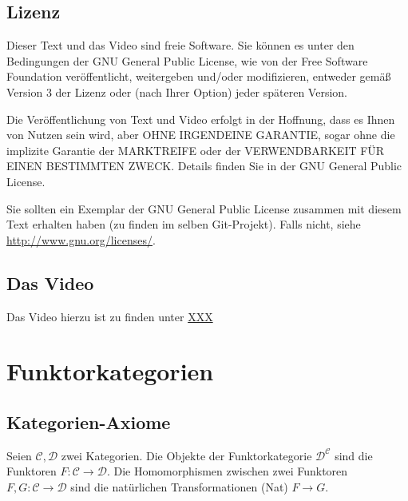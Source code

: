 \documentclass[a4paper]{amsart}
\theoremstyle{definition}
\newcommand{\CC}{\ensuremath{\mathcal{ C }}}
\newcommand{\DD}{\ensuremath{\mathcal{ D }}}
\begin{document}
\subsection*{Lizenz}
Dieser Text und das Video sind freie Software. Sie können es unter den Bedingungen der
GNU General Public License, wie von der Free Software Foundation veröffentlicht, weitergeben
und/oder modifizieren, entweder gemäß Version 3 der Lizenz oder (nach Ihrer Option) jeder späteren Version.

Die Veröffentlichung von Text und Video erfolgt in der Hoffnung, dass es Ihnen von Nutzen sein wird,
aber OHNE IRGENDEINE GARANTIE, sogar ohne die implizite Garantie der MARKTREIFE oder der
VERWENDBARKEIT FÜR EINEN BESTIMMTEN ZWECK. Details finden Sie in der GNU General Public License.

Sie sollten ein Exemplar der GNU General Public License zusammen mit diesem Text erhalten haben
(zu finden im selben Git-Projekt).
Falls nicht, siehe \url{http://www.gnu.org/licenses/}.

\subsection*{Das Video}
Das Video hierzu ist zu finden unter
{\tiny
   \url{XXX}
}

\section{Funktorkategorien}

\subsection{Kategorien-Axiome}
Seien $\CC, \DD$ zwei Kategorien. Die Objekte der Funktorkategorie $\DD^\CC$ sind die Funktoren $F \colon \CC \to \DD$. Die Homomorphismen zwischen zwei Funktoren $F, G \colon \CC \to \DD$ sind die natürlichen Transformationen (Nat) $F \to G$.
\end{document}
